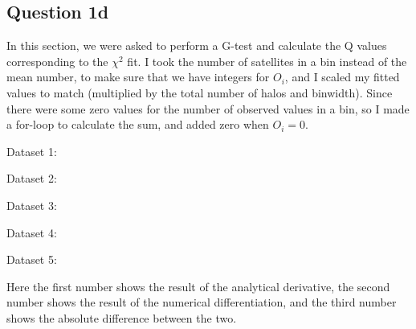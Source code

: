 \subsection{Question 1d}

In this section, we were asked to perform a G-test and calculate the Q values corresponding to the $\chi^2$ fit. 
I took the number of satellites in a bin instead of the mean number, to make sure that we have integers for $O_i$, and I scaled my fitted values to match (multiplied by the total number of halos and binwidth).
Since there were some zero values for the number of observed values in a bin, so I made a for-loop to calculate the sum, and added zero when $O_i = 0$.

Dataset 1:

Dataset 2:

Dataset 3:

Dataset 4:

Dataset 5:


Here the first number shows the result of the analytical derivative, the second number shows the result of the numerical differentiation, and the third number shows the absolute difference between the two.


